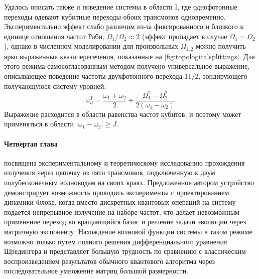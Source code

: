 \documentclass[14pt, a4paper]{extarticle}
\begin{document}
Удалось описать также и поведение системы в области I, где однофотонные переходы одевают кубитные переходы обоих трансмонов одновременно. Экспериментально эффект слабо различим из-за фиксированного и близкого к единице отношения частот Раби, $\Omega_1/\Omega_2 \approx 2$ (эффект пропадает в случае $\Omega_1 = \Omega_2$), однако в численном моделировании для произвольных $\Omega_{1,2}$ можно получить ярко выраженные квазипересечения, показанные на \autoref{fig:topologicalsplittings}. Для этого режима самосогласованным методом получено универсальное выражение, описывающее поведение частоты двухфотонного перехода 11/2, зондирующего получающуюся систему уровней:
\begin{equation}
\omega_d^I = \frac{\omega_{1} + \omega_{2}}{2} + \frac{\Omega_{1}^{2} - \Omega_{2}^{2}}{ 2\left(\omega_{1} - \omega_{2}\right)}
\label{eq:topo_comm}
\end{equation}
Выражение расходится в области равенства частот кубитов, и поэтому может применяться в области $|\omega_1 - \omega_2| \geq J$.

\paragraph{Четвертая глава} посвящена экспериментальному и теоретическому исследованию прохождения излучения через цепочку из пяти трансмонов, подключенную к двум полубесконечным волноводам на своих краях. Предложенное автором устройство демонстрирует возможность проводить эксперименты с проектированием динамики Флоке, когда вместо дискретных квантовых операций на систему подается непрерывное излучение на наборе частот, что делает невозможным применение переход во вращающийся базис и решение задачи эволюции через матричную экспоненту. Нахождение волновой функции системы в таком режиме возможно только путем полного решения дифференциального уравнения Шредингера и представляет большую трудность по сравнению с классическим воспроизведением результатов обычного квантового алгоритма через последовательное умножение матриц большой размерности. 
 
\end{document}
